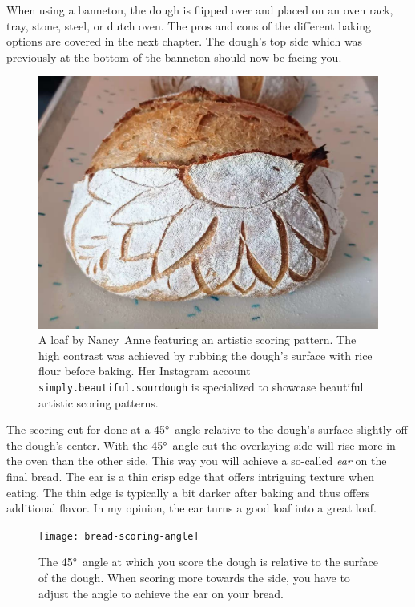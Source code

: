When using a banneton, the dough is flipped over and
placed on an oven rack, tray, stone, steel, or dutch oven. The pros
and cons of the different baking options are covered in the next chapter.
The dough's top side which was previously at the bottom of the
banneton should now be facing you.

\begin{figure}[htb!]
  \includegraphics[width=\textwidth]{artistic-scoring}
  \caption[Artistic scoring]{A loaf by Nancy~Anne featuring an artistic
      scoring pattern.  The high contrast was achieved by rubbing the dough's
      surface with rice flour before baking. Her Instagram account
      \texttt{simply.beautiful.sourdough} is specialized to showcase beautiful
      artistic scoring patterns.}%
  \label{fig:artistic-scoring}
\end{figure}

The scoring cut for done at a \ang{45}~angle relative to the dough's
surface slightly off the dough's center. With the \ang{45}~angle cut
the overlaying side will rise more in the oven than the other side.
This way you will achieve a so-called \emph{ear} on the final bread.
The ear is a thin crisp edge that offers intriguing texture
when eating. The thin edge is typically a bit darker after baking
and thus offers additional flavor. In my opinion, the ear turns
a good loaf into a great loaf.

\begin{figure}[htb!]
  \texttt{[image: bread-scoring-angle]}
  \caption[Scoring angle]{The \ang{45}~angle at which you score the
      dough is relative to the surface of the dough.  When scoring more towards
      the side, you have to adjust the angle to achieve the ear on your
      bread.}%
  \label{fig:scoring-angle}
\end{figure}

